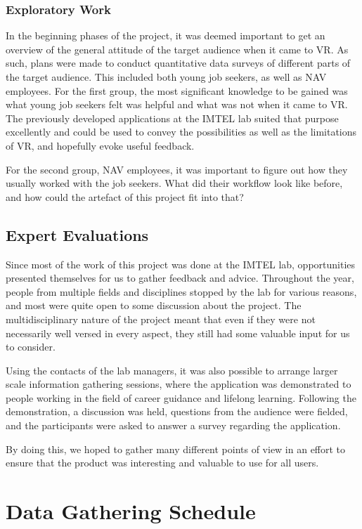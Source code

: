 \subsubsection{Exploratory Work}
In the beginning phases of the project, it was deemed important to get an overview of the general attitude of the target audience when it came to VR. As such, plans were made to conduct quantitative data surveys of different parts of the target audience. This included both young job seekers, as well as NAV employees. For the first group, the most significant knowledge to be gained was what young job seekers felt was helpful and what was not when it came to VR. The previously developed applications at the IMTEL lab suited that purpose excellently and could be used to convey the possibilities as well as the limitations of VR, and hopefully evoke useful feedback.

For the second group, NAV employees, it was important to figure out how they usually worked with the job seekers. What did their workflow look like before, and how could the artefact of this project fit into that?


\subsection{Expert Evaluations}
Since most of the work of this project was done at the IMTEL lab, opportunities presented themselves for us to gather feedback and advice. Throughout the year, people from multiple fields and disciplines stopped by the lab for various reasons, and most were quite open to some discussion about the project. The multidisciplinary nature of the project meant that even if they were not necessarily well versed in every aspect, they still had some valuable input for us to consider.

Using the contacts of the lab managers, it was also possible to arrange larger scale information gathering sessions, where the application was demonstrated to people working in the field of career guidance and lifelong learning. Following the demonstration, a discussion was held, questions from the audience were fielded, and the participants were asked to answer a survey regarding the application. 

By doing this, we hoped to gather many different points of view in an effort to ensure that the product was interesting and valuable to use for all users.

\section{Data Gathering Schedule}



\cleardoublepage